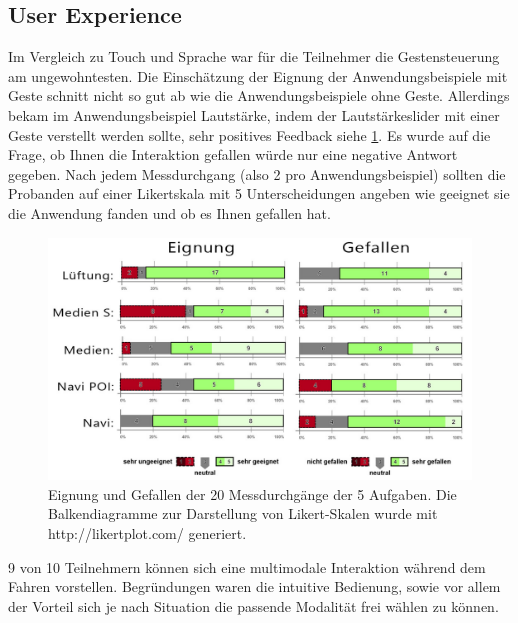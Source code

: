 \subsection[User Experience]{User Experience}
Im Vergleich zu Touch und Sprache war für die Teilnehmer die Gestensteuerung am ungewohntesten. 
Die Einschätzung der Eignung der Anwendungsbeispiele mit Geste schnitt nicht so gut ab wie die Anwendungsbeispiele ohne Geste. Allerdings bekam im Anwendungsbeispiel Lautstärke, indem der Lautstärkeslider mit einer Geste verstellt werden sollte, sehr positives Feedback siehe \ref{fig:Smiley_Eignung_Gefallen}. Es wurde auf die Frage, ob Ihnen die Interaktion gefallen würde nur eine negative Antwort gegeben. Nach jedem Messdurchgang (also 2 pro Anwendungsbeispiel) sollten die Probanden auf einer Likertskala mit 5 Unterscheidungen angeben wie geeignet sie die Anwendung fanden und ob es Ihnen gefallen hat.
\begin{figure}
	\centering
		\includegraphics[width=1\textwidth]{img/Smiley_Eignung_Gefallen.jpg}
	\caption[Eignung und Gefallen der 5 Aufgaben]{Eignung und Gefallen der 20 Messdurchgänge der 5 Aufgaben. Die Balkendiagramme zur Darstellung von Likert-Skalen wurde mit http://likertplot.com/ generiert.}
	\label{fig:Smiley_Eignung_Gefallen}
\end{figure}
 
9 von 10 Teilnehmern können sich eine multimodale Interaktion während dem Fahren vorstellen. Begründungen waren die intuitive Bedienung, sowie vor allem der Vorteil sich je nach Situation die passende Modalität frei wählen zu können.

